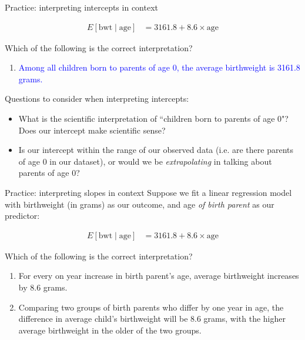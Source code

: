 \documentclass[10pt,t]{beamer}
\begin{document}
\begin{frame}{Practice: interpreting intercepts in context}


\begin{align*}
E[\text{bwt} \mid \text{age}] & = 3161.8 + 8.6 \times \text{age}
\end{align*}

Which of the following is the correct interpretation?

\vspace{0.3cm}

\begin{enumerate}
	\item[] \textcolor{blue}{Among all children born to parents of age $0$, the average birthweight is 3161.8 grams.}
\end{enumerate}

Questions to consider when interpreting intercepts:

\begin{itemize}
	\item What is the scientific interpretation of ``children born to parents of age 0"? Does our intercept make scientific sense?
	\item Is our intercept within the range of our observed data (i.e. are there parents of age $0$ in our dataset), or would we be \textit{extrapolating} in talking about parents of age $0$?
\end{itemize}

\end{frame}

\begin{frame}{Practice: interpreting slopes in context}
Suppose we fit a linear regression model with birthweight (in grams) as our outcome, and age \textit{of birth parent} as our predictor:

\begin{align*}
E[\text{bwt} \mid \text{age}] & = 3161.8 + 8.6 \times \text{age}
\end{align*}

Which of the following is the correct interpretation?

\begin{enumerate}
	\item For every on year increase in birth parent's age, average birthweight increases by 8.6 grams.
	\item Comparing two groups of birth parents who differ by one year in age, the difference in average child's birthweight will be 8.6 grams, with the higher average birthweight in the older of the two groups.
\end{enumerate}

\end{frame}
\end{document}

